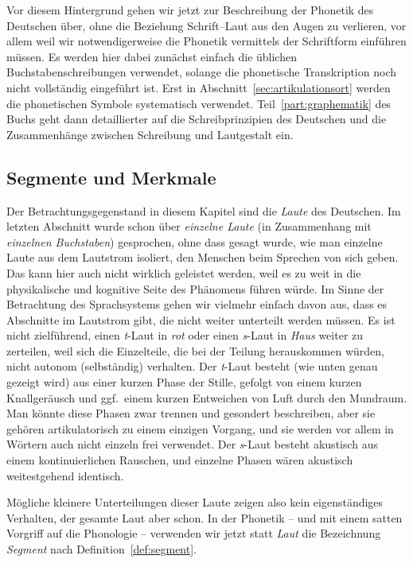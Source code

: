 Vor diesem Hintergrund gehen wir jetzt zur Beschreibung der Phonetik des Deutschen über, ohne die Beziehung Schrift--Laut aus den Augen zu verlieren, vor allem weil wir notwendigerweise die Phonetik vermittels der Schriftform einführen müssen.
Es werden hier dabei zunächst einfach die üblichen Buchstabenschreibungen verwendet, solange die phonetische Transkription noch nicht vollständig eingeführt ist.
Erst in Abschnitt~\ref{sec:artikulationsort} werden die phonetischen Symbole systematisch verwendet.
Teil~\ref{part:graphematik} des Buchs geht dann detaillierter auf die Schreibprinzipien des Deutschen und die Zusammenhänge zwischen Schreibung und Lautgestalt ein.

\subsection{Segmente und Merkmale}
\label{sec:segmenteundmerkmale}

Der Betrachtungsgegenstand in diesem Kapitel sind die \textit{Laute} des Deutschen.
Im letzten Abschnitt wurde schon über \textit{einzelne Laute} (in Zusammenhang mit \textit{einzelnen Buchstaben}) gesprochen, ohne dass gesagt wurde, wie man einzelne Laute aus dem Lautstrom isoliert, den Menschen beim Sprechen von sich geben.
Das kann hier auch nicht wirklich geleistet werden, weil es zu weit in die physikalische und kognitive Seite des Phänomens führen würde.
Im Sinne der Betrachtung des Sprachsystems gehen wir vielmehr einfach davon aus, dass es Abschnitte im Lautstrom gibt, die nicht weiter unterteilt werden müssen.
Es ist \zB nicht zielführend, einen \textit{t}-Laut in \textit{rot} oder einen \textit{s}-Laut in \textit{Haus} weiter zu zerteilen, weil sich die Einzelteile, die bei der Teilung herauskommen würden, nicht autonom (selbständig) verhalten.
Der \textit{t}-Laut besteht (wie unten genau gezeigt wird) aus einer kurzen Phase der Stille, gefolgt von einem kurzen Knallgeräusch und ggf.\ einem kurzen Entweichen von Luft durch den Mundraum.
Man könnte diese Phasen zwar trennen und gesondert beschreiben, aber sie gehören artikulatorisch zu einem einzigen Vorgang, und sie werden vor allem in Wörtern auch nicht einzeln frei verwendet.
Der \textit{s}-Laut besteht akustisch aus einem kontinuierlichen Rauschen, und einzelne Phasen wären akustisch weitestgehend identisch.

Mögliche kleinere Unterteilungen dieser Laute zeigen also kein eigenständiges Verhalten, der gesamte Laut aber schon.
In der Phonetik -- und mit einem satten Vorgriff auf die Phonologie -- verwenden wir jetzt statt \textit{Laut} die Bezeichnung \textit{Segment} nach Definition~\ref{def:segment}.

